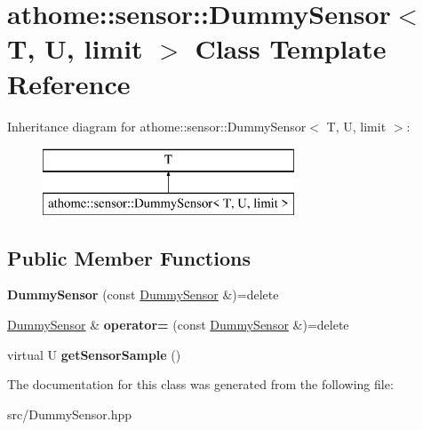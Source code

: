 \hypertarget{classathome_1_1sensor_1_1_dummy_sensor}{}\section{athome\+:\+:sensor\+:\+:Dummy\+Sensor$<$ T, U, limit $>$ Class Template Reference}
\label{classathome_1_1sensor_1_1_dummy_sensor}
Inheritance diagram for athome\+:\+:sensor\+:\+:Dummy\+Sensor$<$ T, U, limit $>$\+:\begin{figure}[H]
\begin{center}
\leavevmode
\includegraphics[height=2.000000cm]{classathome_1_1sensor_1_1_dummy_sensor}
\end{center}
\end{figure}
\subsection*{Public Member Functions}
\begin{DoxyCompactItemize}
\item 
\mbox{\label{classathome_1_1sensor_1_1_dummy_sensor_ac9ac77587454246fb4f1f79010262a27}} 
{\bfseries Dummy\+Sensor} (const \mbox{\hyperlink{classathome_1_1sensor_1_1_dummy_sensor}{Dummy\+Sensor}} \&)=delete
\item 
\mbox{\label{classathome_1_1sensor_1_1_dummy_sensor_a65546910321b5bbbf00b12069ee484ee}} 
\mbox{\hyperlink{classathome_1_1sensor_1_1_dummy_sensor}{Dummy\+Sensor}} \& {\bfseries operator=} (const \mbox{\hyperlink{classathome_1_1sensor_1_1_dummy_sensor}{Dummy\+Sensor}} \&)=delete
\item 
\mbox{\label{classathome_1_1sensor_1_1_dummy_sensor_ab01a87f5dfa35297adf55ecefe407ba4}} 
virtual U {\bfseries get\+Sensor\+Sample} ()
\end{DoxyCompactItemize}


The documentation for this class was generated from the following file\+:\begin{DoxyCompactItemize}
\item 
src/Dummy\+Sensor.\+hpp\end{DoxyCompactItemize}
